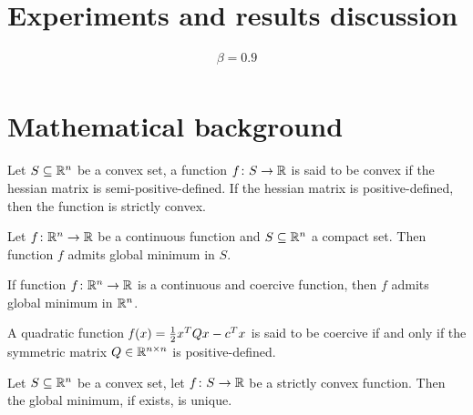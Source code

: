 \section{Experiments and results discussion}

\[
\begin{array}{l}
\beta=0.9 \\
\end{array}
\]


\cleardoublepage
\section{Mathematical background}

\begin{defs}\label{def:conv_fun}
	Let $S\subseteq\mathbb{R}^n$ be a convex set, a function $f\colon S\to\mathbb{R}$ is said to be convex if the hessian matrix is semi-positive-defined. If the hessian matrix is positive-defined, then the function is strictly convex.
\end{defs}

\begin{thm}\label{thm:weirs}
	Let $f\colon\mathbb{R}^n\to\mathbb{R}$ be a continuous function and $S\subseteq\mathbb{R}^n$ a compact set. Then function $f$ admits global minimum in $S$.
\end{thm}

\begin{cor}\label{cor:weirs1}
	If function $f\colon\mathbb{R}^n\to\mathbb{R}$ is a continuous and coercive function, then $f$ admits global minimum in $\mathbb{R}^n$.
\end{cor}

\begin{prop}
	A quadratic function $\operatorname*{\mathit{f}}(x)=\frac{1}{2}x^TQx-c^Tx$ is said to be coercive if and only if the symmetric matrix $Q\in\mathbb{R}^{n\times n}$ is positive-defined.
\end{prop}

\begin{prop}\label{prop:min_unique}
	Let $S\subseteq\mathbb{R}^n$ be a convex set, let $f\colon S\to\mathbb{R}$ be a strictly convex function. Then the global minimum, if exists, is unique.
\end{prop}


